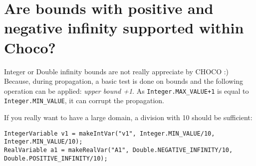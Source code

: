 \section{Are bounds with positive and negative infinity supported within Choco?}\label{faq:areboundswithpositiveandnegativeinfinitysupportedwithinchoco}\hypertarget{faq:areboundswithpositiveandnegativeinfinitysupportedwithinchoco}{}

Integer or Double infinity bounds are not really appreciate by CHOCO :) 
Because, during propagation, a basic test is done on bounds and the following operation can be applied: 
\emph{upper bound +1}.
As \texttt{Integer.MAX\_VALUE+1} is equal to \texttt{Integer.MIN\_VALUE}, it can corrupt the propagation. 

If you really want to have a large domain, a division with 10 should be sufficient: 
\begin{lstlisting}
IntegerVariable v1 = makeIntVar("v1", Integer.MIN_VALUE/10, Integer.MIN_VALUE/10);
RealVariable a1 = makeRealVar("A1", Double.NEGATIVE_INFINITY/10, Double.POSITIVE_INFINITY/10);
\end{lstlisting}
